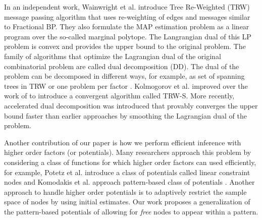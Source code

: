 \documentclass[letterpaper, 10 pt, conference]{ieeeconf} %
\begin{document}
In an 
independent work, Wainwright et al.  \cite{wainwright2005map} introduce Tree 
Re-Weighted (TRW) message passing algorithm that uses re-weighting of edges and 
messages similar to Fractional BP. They also formulate the MAP estimation 
problem as a linear program over the so-called marginal polytope.  The 
Langrangian dual of this LP problem is convex and provides the upper bound to 
the original problem. The family of algorithms that optimize the Lagrangian dual 
of the original combinatorial problem are called dual decomposition (DD). The 
dual of the problem can be decomposed in different ways, for example, as set of 
spanning trees in TRW \cite{wainwright2005map} or one problem per factor 
\cite{sontag2011introduction}. Kolmogorov et al.  \cite{kschischang2001factor} 
improved over the work of \cite{wainwright2005map} to introduce a convergent 
algorithm called TRW-S.  More recently, accelerated dual decomposition 
\cite{jojic2010accelerated} was introduced that provably converges the upper 
bound faster than earlier approaches by smoothing the Lagrangian dual of the 
problem. 

Another contribution of our paper is how we perform efficient inference with 
higher order factors (or potentials). Many researchers approach this problem
by considering a class of functions for which higher order factors can used
efficiently, for example, Potetz et al. introduce a class of potentials called
linear constraint nodes \cite{potetz2007efficient} and Komodakis et al.
approach pattern-based class of potentials \cite{komodakis2009beyond}.
Another approach to handle higher order potentials
\cite{leonardis2006efficient}  is to adaptively restrict the sample space of
nodes by using initial estimates.   Our work proposes a generalization of the 
pattern-based potentials of \cite{komodakis2009beyond} allowing for 
\textit{free} nodes to appear within a pattern.
\end{document}
